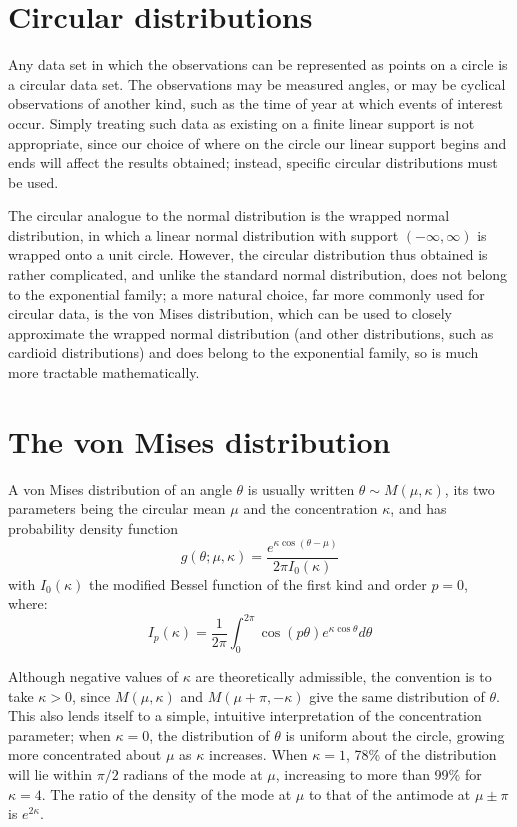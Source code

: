 \documentclass[12pt,fleqn]{article}
\begin{document}
\section{Circular distributions}

Any data set in which the observations can be represented as points on a circle is a circular data set. The observations may be measured angles, or may be cyclical observations of another kind, such as the time of year at which events of interest occur. Simply treating such data as existing on a finite linear support is not appropriate, since our choice of where on the circle our linear support begins and ends will affect the results obtained; instead, specific circular distributions must be used.

The circular analogue to the normal distribution is the wrapped normal distribution, in which a linear normal distribution with support $(-\infty, \infty)$ is wrapped onto a unit circle. However, the circular distribution thus obtained is rather complicated, and unlike the standard normal distribution, does not belong to the exponential family; a more natural choice, far more commonly used for circular data, is the von Mises distribution, which can be used to closely approximate the wrapped normal distribution (and other distributions, such as cardioid distributions) and does belong to the exponential family, so is much more tractable mathematically. 


\section{The von Mises distribution}
A von Mises distribution of an angle $\theta$ is usually written $\theta \sim M(\mu, \kappa)$, its two parameters being the circular mean $\mu$ and the concentration $\kappa$, and has probability density function
\[g(\theta ; \mu, \kappa) = \frac{e^{\kappa \cos(\theta - \mu)}}{2\pi I_0(\kappa)}\]
with $I_0(\kappa)$ the modified Bessel function of the first kind and order $p=0$, where:
\[I_p(\kappa) = \frac{1}{2\pi} \int_0^{2\pi} \cos(p\theta) e^{\kappa \cos \theta} d\theta \]

Although negative values of $\kappa$ are theoretically admissible, the convention is to take $\kappa > 0$, since $M(\mu, \kappa)$ and $M(\mu+\pi, -\kappa)$ give the same distribution of $\theta$. This also lends itself to a simple, intuitive interpretation of the concentration parameter; when $\kappa = 0$, the distribution of $\theta$ is uniform about the circle, growing more concentrated about $\mu$ as $\kappa$ increases. When $\kappa = 1$, 78\% of the distribution will lie within $\pi/2$ radians of the mode at $\mu$, increasing to more than 99\% for $\kappa = 4$. The ratio of the density of the mode at $\mu$ to that of the antimode at $\mu \pm \pi$ is $e^{2\kappa}$.
\end{document}

